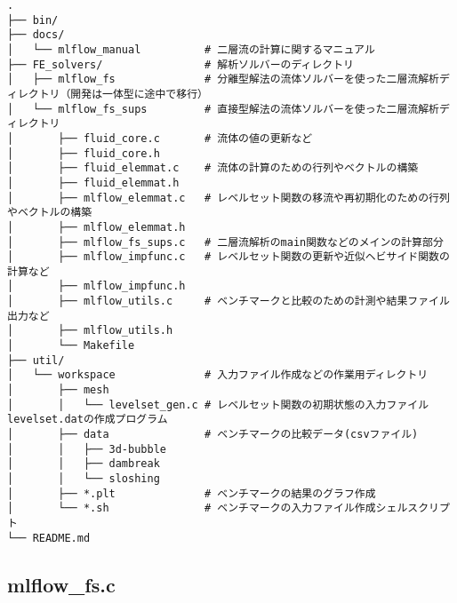 \begin{verbatim}
.
├── bin/
├── docs/
│   └── mlflow_manual          # 二層流の計算に関するマニュアル
├── FE_solvers/                # 解析ソルバーのディレクトリ
│   ├── mlflow_fs              # 分離型解法の流体ソルバーを使った二層流解析ディレクトリ（開発は一体型に途中で移行）
│   └── mlflow_fs_sups         # 直接型解法の流体ソルバーを使った二層流解析ディレクトリ
│   	├── fluid_core.c       # 流体の値の更新など
│   	├── fluid_core.h
│   	├── fluid_elemmat.c    # 流体の計算のための行列やベクトルの構築
│   	├── fluid_elemmat.h
│   	├── mlflow_elemmat.c   # レベルセット関数の移流や再初期化のための行列やベクトルの構築
│   	├── mlflow_elemmat.h
│   	├── mlflow_fs_sups.c   # 二層流解析のmain関数などのメインの計算部分
│   	├── mlflow_impfunc.c   # レベルセット関数の更新や近似ヘビサイド関数の計算など
│   	├── mlflow_impfunc.h
│   	├── mlflow_utils.c     # ベンチマークと比較のための計測や結果ファイル出力など
│   	├── mlflow_utils.h
│   	└── Makefile
├── util/
│   └── workspace              # 入力ファイル作成などの作業用ディレクトリ
│   	├── mesh
│   	│   └── levelset_gen.c # レベルセット関数の初期状態の入力ファイルlevelset.datの作成プログラム
│   	├── data               # ベンチマークの比較データ(csvファイル)
│   	│   ├── 3d-bubble
│   	│   ├── dambreak
│   	│   └── sloshing
│   	├── *.plt              # ベンチマークの結果のグラフ作成
│   	└── *.sh               # ベンチマークの入力ファイル作成シェルスクリプト
└── README.md
\end{verbatim}

\subsection{mlflow\_fs.c}
